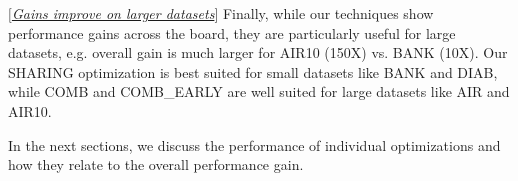 \begin{denselist}
\item $[$\underline{\em Gains improve on larger datasets}$]$ Finally, while our techniques show performance gains across the board, they are particularly useful for large datasets, e.g. overall gain is much larger for AIR10 (150X) vs. BANK (10X). Our SHARING optimization is best suited for small datasets like BANK and DIAB, while COMB and COMB\_EARLY are well suited for large datasets like AIR and AIR10.
\end{denselist}



In the next sections, we discuss the performance of individual optimizations and how they relate to the overall performance gain.



